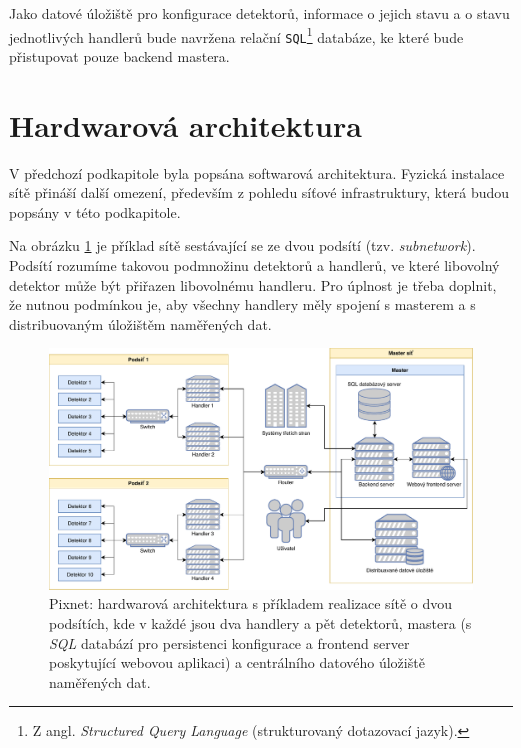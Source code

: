 Jako datové úložiště pro konfigurace detektorů, informace o jejich stavu a o stavu jednotlivých handlerů bude navržena relační \texttt{SQL}\footnote{Z angl. \textit{Structured Query Language} (strukturovaný dotazovací jazyk).} databáze, ke které bude přistupovat pouze backend mastera.

\section{Hardwarová architektura}\label{chap:arch:hw}
V předchozí podkapitole byla popsána softwarová architektura. Fyzická instalace sítě přináší další omezení, především z pohledu síťové infrastruktury, která budou popsány v této podkapitole.

Na obrázku \ref{fig:arch:hw_architecture} je příklad sítě sestávající se ze dvou podsítí (tzv. \textit{subnetwork}). Podsítí rozumíme takovou podmnožinu detektorů a handlerů, ve které libovolný detektor může být přiřazen libovolnému handleru. Pro úplnost je třeba doplnit, že nutnou podmínkou je, aby všechny handlery měly spojení s masterem a s distribuovaným úložištěm naměřených dat.

\begin{figure}[h]
	\begin{center}
		\includegraphics[width=15cm]{figures/arch_hw.pdf}
		\caption{Pixnet: hardwarová architektura s příkladem realizace sítě o dvou podsítích, kde v každé jsou dva handlery a pět detektorů, mastera (s \textit{SQL} databází pro persistenci konfigurace a frontend server poskytující webovou aplikaci) a centrálního datového úložiště naměřených dat.}
		\label{fig:arch:hw_architecture}
	\end{center}
\end{figure}

